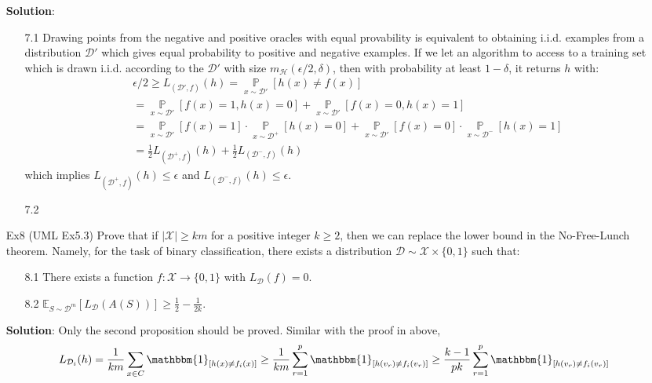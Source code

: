 \documentclass{article}
\begin{document}
\begin{itemize}
\begin{itemize}
	\item[] \textbf{Solution}:
	\begin{itemize}
	\item[7.1] Drawing points from the negative and positive oracles with equal provability is equivalent to obtaining i.i.d. examples from a distribution $\mathcal{D}'$ which gives equal probability to positive and negative examples. If we let an algorithm to access to a training set which is drawn i.i.d. according to the $\mathcal{D}'$ with size $m_\mathcal{H}(\epsilon/2, \delta)$, then with probability at least $1-\delta$, it returns $h$ with:
	\begin{equation*}
	\begin{split}
	& \epsilon/2 \geq L_{(\mathcal{D}',f)}(h) = \mathop{\mathbb{P}}\limits_{x\sim\mathcal{D}'}[h(x)\neq f(x)] \\
	& = \mathop{\mathbb{P}}\limits_{x\sim\mathcal{D}'}[f(x)=1, h(x)=0] + \mathop{\mathbb{P}}\limits_{x\sim\mathcal{D}'}[f(x)=0, h(x)=1] \\
	& = \mathop{\mathbb{P}}\limits_{x\sim\mathcal{D}'}[f(x)=1] \cdot \mathop{\mathbb{P}}\limits_{x\sim\mathcal{D}^+}[h(x)=0] + \mathop{\mathbb{P}}\limits_{x\sim\mathcal{D}'}[f(x)=0] \cdot \mathop{\mathbb{P}}\limits_{x\sim\mathcal{D}^-}[h(x)=1] \\
	& = \frac{1}{2}L_{(\mathcal{D}^+,f)}(h) + \frac{1}{2}L_{(\mathcal{D}^-,f)}(h)
	\end{split} 
	\end{equation*}
which implies $L_{(\mathcal{D}^+,f)}(h)\leq\epsilon$ and $L_{(\mathcal{D}^-,f)}(h)\leq\epsilon$.
	\item[7.2] 
	\end{itemize}
	
\item[Ex8] (UML Ex5.3) Prove that if $|\mathcal{X}|\geq km$ for a positive integer $k\geq 2$, then we can replace the lower bound in the No-Free-Lunch theorem. Namely, for the task of binary classification, there exists a distribution $\mathcal{D}\sim\mathcal{X}\times\{0,1\}$ such that:

	\begin{itemize}
	\item[8.1] There exists a function $f:\mathcal{X}\rightarrow\{0,1\}$ with $L_\mathcal{D}(f)=0$.
	\item[8.2] $\mathbb{E}_{S\sim\mathcal{D}^m}[L_\mathcal{D}(A(S))]\geq\frac{1}{2}-\frac{1}{2k}$.
	\end{itemize}

\item[] \textbf{Solution}:
	Only the second proposition should be proved. Similar with the proof in above, 
	\begin{equation*}
	L_{\mathcal{D}_i}(h)=\frac{1}{km}\sum_{x\in C}\mathbbm{1}_{[h(x)\neq f_i(x)]}\geq\frac{1}{km}\sum_{r=1}^p\mathbbm{1}_{[h(v_r)\neq f_i(v_r)]}\geq\frac{k-1}{pk}\sum_{r=1}^p\mathbbm{1}_{[h(v_r)\neq f_i(v_r)]}
	\end{equation*}
 

\end{itemize}
\end{itemize}
\end{document}
